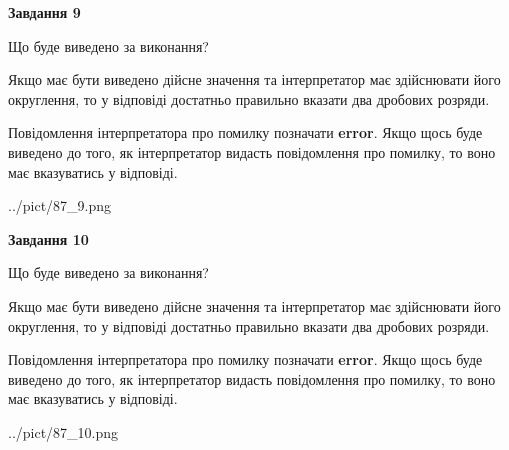 \documentclass[12pt, ukrainian]{article}
\begin{document}
{\begin {Large}
{\begin {center}\textbf{Завдання 9}\end {center}}\par
Що буде виведено за виконання? \par

Якщо має бути виведено дійсне значення та інтерпретатор має здійснювати його округлення, 
то у відповіді достатньо правильно вказати два дробових розряди.

Повідомлення інтерпретатора про помилку позначати \textbf{error}.
Якщо щось буде виведено до того, як інтерпретатор видасть повідомлення про помилку, 
то воно має вказуватись у відповіді. \par

\begin{center}
	{../pict/87_9.png}
\end{center}
\newpage

{\begin {center}\textbf{Завдання 10}\end {center}}\par
Що буде виведено за виконання? \par

Якщо має бути виведено дійсне значення та інтерпретатор має здійснювати його округлення, 
то у відповіді достатньо правильно вказати два дробових розряди.

Повідомлення інтерпретатора про помилку позначати \textbf{error}.
Якщо щось буде виведено до того, як інтерпретатор видасть повідомлення про помилку, 
то воно має вказуватись у відповіді. \par

\begin{center}
	{../pict/87_10.png}
\end{center}
\newpage

\end {Large}}
\end{document}
